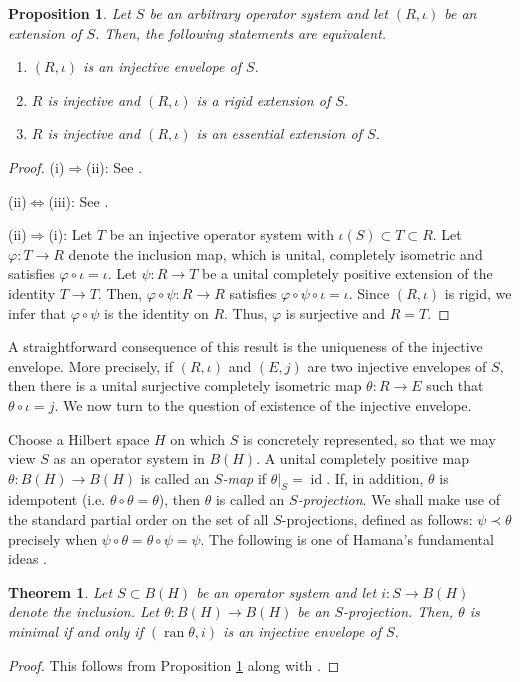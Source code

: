 \documentclass[10pt]{amsart}
\renewcommand{\phi}{\varphi}
\newcommand{\id}{\operatorname{id}}
\newcommand{\ran}{\operatorname{ran}}
\newtheorem{theorem}[lemma]{Theorem}
\newtheorem{proposition}[lemma]{Proposition}
\theoremstyle{definition}
\begin{document}
\begin{proposition}\label{P:injenvchar}
Let $S$ be an arbitrary operator system and let $(R,\iota)$ be an extension of $S$. Then, the following statements are equivalent.
\begin{enumerate}[{\rm (i)}]
\item $(R,\iota)$ is an injective envelope of $S$.
\item $R$ is injective and $(R,\iota)$ is a rigid extension of $S$.
\item $R$ is injective and $(R,\iota)$ is an essential extension of $S$.
\end{enumerate}
\end{proposition}
\begin{proof}
(i)$\Rightarrow$(ii): See \cite[Corollary 15.7]{paulsen2002}.

(ii)$\Leftrightarrow$(iii): See \cite[Lemma 3.7]{hamana1979}.

(ii)$\Rightarrow$(i): Let $T$ be an injective operator system with $\iota(S)\subset T\subset R$. Let $\phi:T\to R$ denote the inclusion map, which is unital, completely isometric and satisfies $\phi\circ\iota=\iota$. Let $\psi:R\to T$ be a unital completely positive extension of the identity $T\to T$. Then, $\phi\circ \psi:R\to R$ satisfies $\phi\circ \psi\circ \iota=\iota$. Since $(R,\iota)$ is rigid, we infer that $\phi\circ\psi$ is the identity on $R$. Thus, $\phi$ is surjective and $R=T$.
\end{proof}

A straightforward consequence of this result is the uniqueness of the injective envelope. More precisely, if  $(R,\iota)$ and $(E,j)$ are two injective envelopes of $S$, then  there is a unital surjective completely isometric map $\theta:R\to E$ such that $\theta\circ \iota=j$. We now turn to the question of existence of the injective envelope.

Choose a Hilbert space $H$ on which $S$ is concretely represented, so that we may view $S$ as an operator system in $B(H)$. A unital completely positive map $\theta:B(H)\to B(H)$ is called an \emph{$S$-map} if $\theta|_S=\id$. If, in addition, $\theta$ is idempotent (i.e.  $\theta\circ \theta=\theta$), then $\theta$ is called an \emph{$S$-projection}. We shall  make use of the standard  partial order on the set of all $S$-projections, defined as follows: $\psi\prec\theta$ precisely when $\psi\circ \theta=\theta\circ \psi=\psi$. The following is one of Hamana's fundamental ideas \cite{hamana1979}.


\begin{theorem}\label{T:Hamana}
Let $S\subset B(H)$ be an operator system and let $i:S\to B(H)$ denote the inclusion. Let $\theta:B(H)\to B(H)$ be an $S$-projection. Then, $\theta$ is minimal if and only if $( \ran \theta, i)$ is an injective envelope of $S$.   
\end{theorem}
\begin{proof}
This follows from Proposition \ref{P:injenvchar} along with \cite[Theorem 2.9]{paulsen2011}.
\end{proof}
\end{document}
